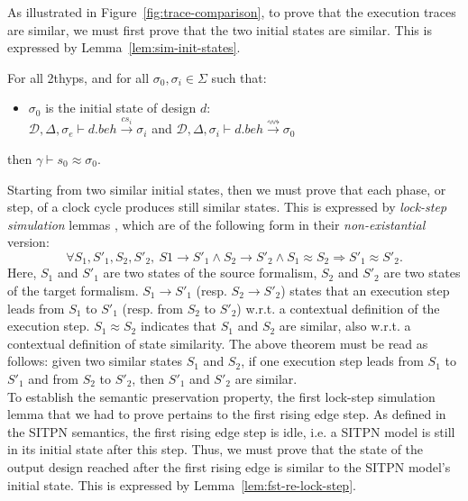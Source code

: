 As illustrated in Figure~\ref{fig:trace-comparison}, to prove that the
execution traces are similar, we must first prove that the two initial
states are similar. This is expressed by
Lemma~\ref{lem:sim-init-states}.
\begin{lemma}
  \label{lem:sim-init-states}
  For all \hm2thyps{}, and for all $\sigma_0,\sigma_i\in{}\Sigma$ such that:
  \begin{itemize}
  \item $\sigma_0$ is the initial state of design $d$:\\
    $\mathcal{D},\Delta,\sigma_e\vdash{}d.beh\xrightarrow{cs_i}{}\sigma_i$ and
    $\mathcal{D},\Delta,\sigma_i\vdash{}d.beh\xrightarrow{\rightsquigarrow}{}\sigma_0$
  \end{itemize}
  then $\gamma\vdash{}s_0\approx\sigma_0$.
\end{lemma}

Starting from two similar initial states, then we must prove that each
phase, or step, of a clock cycle produces still similar states.  This
is expressed by \textit{lock-step simulation} lemmas \cite{Leroy2009},
which are of the following form in their \textit{non-existantial}
version:
\begin{equation*}
  \forall{}S_1,S'_1,S_2,S'_2,~S1\rightarrow{}S'_1\land{}S_2\rightarrow{}S'_2\land{}S_1\approx{}S_2\Rightarrow{}S'_1\approx{}S'_2.
\end{equation*}
Here, $S_1$ and $S'_1$ are two states of the source formalism, $S_2$
and $S'_2$ are two states of the target formalism.
$S_1\rightarrow{}S'_1$ (resp. $S_2\rightarrow{}S'_2$) states that an
execution step leads from $S_1$ to $S'_1$ (resp. from $S_2$ to $S'_2$)
w.r.t. a contextual definition of the execution
step. $S_1\approx{}S_2$ indicates that $S_1$ and $S_2$ are similar,
also w.r.t. a contextual definition of state similarity. The above
theorem must be read as follows: given two similar states $S_1$ and
$S_2$, if one execution step leads from $S_1$ to $S'_1$ and from $S_2$
to $S'_2$, then $S'_1$ and $S'_2$ are similar. \\

To establish the semantic preservation property, the first lock-step
simulation lemma that we had to prove pertains to the first rising
edge step. As defined in the SITPN semantics, the first rising edge
step is idle, i.e. a SITPN model is still in its initial state after
this step. Thus, we must prove that the state of the output design
reached after the first rising edge is similar to the SITPN model's
initial state. This is expressed by Lemma~\ref{lem:fst-re-lock-step}.


